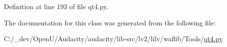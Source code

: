 Definition at line 193 of file qt4.\+py.



The documentation for this class was generated from the following file\+:\begin{DoxyCompactItemize}
\item 
C\+:/\+\_\+dev/\+Open\+U/\+Audacity/audacity/lib-\/src/lv2/lilv/waflib/\+Tools/\hyperlink{lilv_2waflib_2_tools_2qt4_8py}{qt4.\+py}\end{DoxyCompactItemize}
